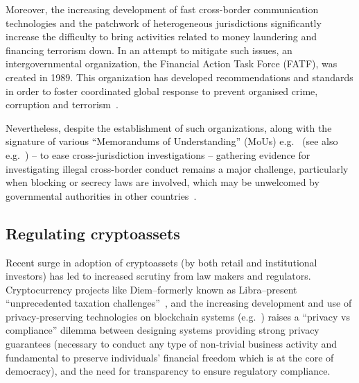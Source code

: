 \documentclass[runningheads,10pt]{llncs}
\numberwithin{equation}{section}
\begin{document}
Moreover, the increasing development of fast cross-border communication technologies
and the patchwork of heterogeneous jurisdictions significantly increase the
difficulty to bring activities related to money laundering and financing terrorism
down. In an attempt to mitigate such issues, an intergovernmental organization, the
Financial Action Task Force (FATF), was created in 1989. This organization has
developed recommendations and standards in order to foster coordinated global
response to prevent organised crime, corruption and terrorism~\cite{fatf-about}.

Nevertheless, despite the establishment of such organizations, along with the
signature of various ``Memorandums of Understanding''
(MoUs) e.g.~\cite{mou-fsa-sec,mou-fsa-cftc} (see also
e.g.~\cite{fca-sec-coop,fca-cftc-coop}) -- to ease
cross-jurisdiction investigations -- gathering evidence for investigating
illegal cross-border conduct remains a major challenge, particularly when
blocking or secrecy laws are involved, which may be unwelcomed by governmental
authorities in other countries~\cite{role-sec}.

\subsection{Regulating cryptoassets}

Recent surge in adoption of cryptoassets (by both retail and institutional
investors) has led to increased scrutiny from law makers and regulators.
Cryptocurrency projects like Diem--formerly known as Libra--present
``unprecedented taxation challenges''~\cite{Law2020Facebook}, and the increasing
development and use of privacy-preserving technologies on blockchain systems
(e.g.~\cite{DBLP:journals/corr/abs-1904-00905,EPRINT:BAZB19,aztec-protocol,zcash-protocol})
raises a ``privacy vs compliance'' dilemma between designing systems providing
strong privacy guarantees (necessary to conduct any type of non-trivial
business activity and fundamental to preserve individuals' financial freedom
which is at the core of democracy), and the need for transparency to ensure
regulatory compliance.
\end{document}
